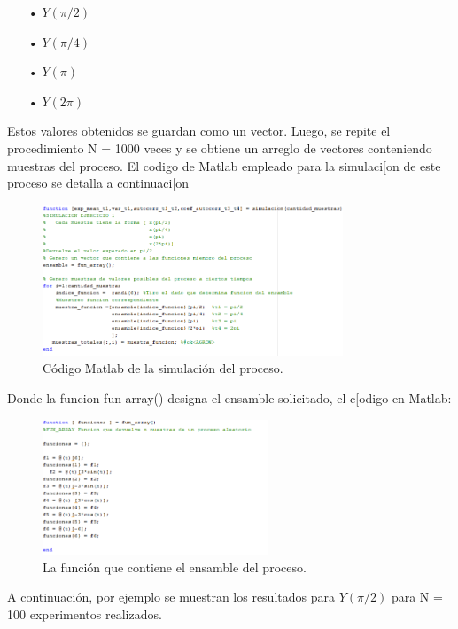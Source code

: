 \begin{enumerate}
   \item[•] $Y(\pi/2)$
   \item[•] $Y(\pi/4)$
   \item[•] $Y(\pi)$
   \item[•] $Y(2\pi)$
\end{enumerate}

Estos valores obtenidos se guardan como un vector. Luego, se repite el procedimiento N = 1000 veces 
y se obtiene un arreglo de vectores conteniendo muestras del proceso.
El codigo de Matlab empleado para la simulaci[on de este proceso se detalla a continuaci[on 
\\

\begin{figure}[H]
\centering
	\includegraphics[width=0.8\textwidth, trim = {0 0 0 0},clip]{./ImagenesEjercicio1/main1.png}
	\caption{Código Matlab de la simulación del proceso.}
	\label{fig:main1}
\end{figure}

Donde la funcion fun-array() designa el ensamble solicitado, el c[odigo en Matlab:

\begin{figure}[H]
\centering
	\includegraphics[width=0.6\textwidth, trim = {0 0 0 0},clip]{./ImagenesEjercicio1/fun_array.png}
	\caption{La función que contiene el ensamble del proceso.}
	\label{fig:fun_array}
\end{figure}

A continuación, por ejemplo se muestran los resultados para $Y(\pi/2)$ para N = 100 experimentos realizados.


